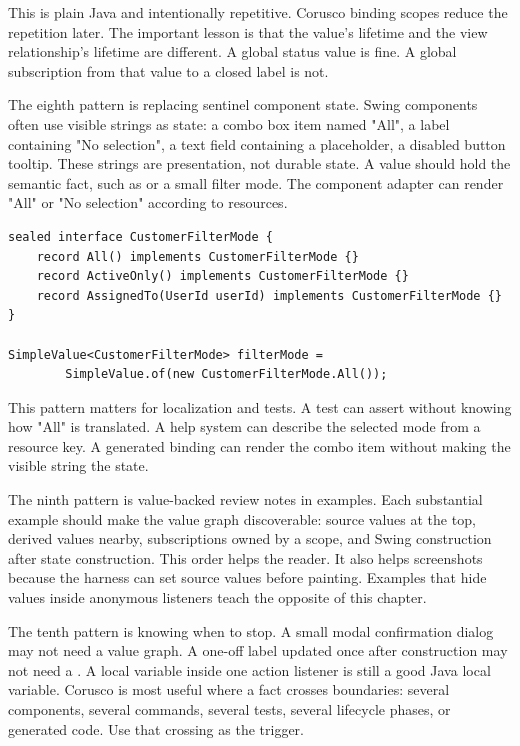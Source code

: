 This is plain Java and intentionally repetitive. Corusco binding scopes reduce
the repetition later. The important lesson is that the value's lifetime and the
view relationship's lifetime are different. A global status value is fine. A
global subscription from that value to a closed label is not.

The eighth pattern is replacing sentinel component state. Swing components often
use visible strings as state: a combo box item named "All", a label containing
"No selection", a text field containing a placeholder, a disabled button
tooltip. These strings are presentation, not durable state. A value should hold
the semantic fact, such as  or a small filter mode.
The component adapter can render "All" or "No selection" according to resources.

\begin{lstlisting}[caption={Semantic filter mode instead of magic combo text.}]
sealed interface CustomerFilterMode {
    record All() implements CustomerFilterMode {}
    record ActiveOnly() implements CustomerFilterMode {}
    record AssignedTo(UserId userId) implements CustomerFilterMode {}
}

SimpleValue<CustomerFilterMode> filterMode =
        SimpleValue.of(new CustomerFilterMode.All());
\end{lstlisting}

This pattern matters for localization and tests. A test can assert
 without knowing how "All" is translated. A help
system can describe the selected mode from a resource key. A generated binding
can render the combo item without making the visible string the state.

The ninth pattern is value-backed review notes in examples. Each substantial
example should make the value graph discoverable: source values at the top,
derived values nearby, subscriptions owned by a scope, and Swing construction
after state construction. This order helps the reader. It also helps screenshots
because the harness can set source values before painting. Examples that hide
values inside anonymous listeners teach the opposite of this chapter.

The tenth pattern is knowing when to stop. A small modal confirmation dialog may
not need a value graph. A one-off label updated once after construction may not
need a . A local variable inside one action listener is still a
good Java local variable. Corusco is most useful where a fact crosses boundaries:
several components, several commands, several tests, several lifecycle phases, or
generated code. Use that crossing as the trigger.

